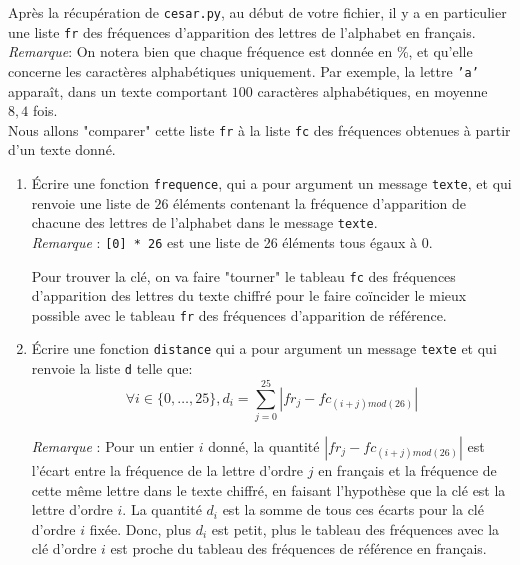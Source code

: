 \documentclass[t,11pt,eleve]{article}
\begin{document}
Après la récupération de \texttt{cesar.py}, au début de votre fichier, il y a en particulier une liste \texttt{fr} des fréquences d'apparition %
des lettres de l'alphabet en français.\\
\emph{Remarque}: On notera bien que chaque fréquence est donnée en \%, et  qu'elle concerne les caractères alphabétiques uniquement. Par exemple, la lettre \texttt{'a'} apparaît, dans un texte comportant  $100$ caractères alphabétiques, en moyenne $8,4$ fois.\\

Nous allons "comparer" cette liste \texttt{fr} à la liste \texttt{fc} des fréquences obtenues à partir d'un texte donné.

\begin{enumerate}
\item \'Ecrire une fonction \texttt{frequence}, qui a pour argument un message \texttt{texte}, et qui renvoie une liste de $26$ éléments contenant la fréquence d'apparition de chacune des lettres de l'alphabet dans le message \texttt{texte}.\\
\emph{Remarque} : \texttt{[0] * 26} est une liste de 26 éléments tous égaux à $0$.


Pour trouver la clé, on va faire "tourner" le tableau \texttt{fc} des fréquences d'apparition des lettres du texte chiffré pour le faire coïncider le mieux possible avec le tableau \texttt{fr} des fréquences d'apparition de référence.
\bigskip
\item \'Ecrire une fonction \texttt{distance} qui a pour argument un message \texttt{texte} et qui renvoie la liste \texttt{d} telle que:
\[\forall i\in\{0,\dots,25\},d_i=\sum_{j=0}^{25}|fr_j-fc_{(i+j)mod(26)}|\]

\emph{Remarque} : Pour un  entier $i$ donné, la quantité $|fr_j-fc_{(i+j)mod(26)}|$ est l'écart entre la fréquence de la lettre d'ordre $j$ en français et la fréquence de cette même lettre dans le texte chiffré, en faisant l'hypothèse que la clé est la lettre d'ordre $i$. 
La quantité $d_i$ est la somme de tous ces écarts pour la clé d'ordre $i$ fixée. Donc, plus $d_i$ est petit, plus le tableau des fréquences avec la clé d'ordre $i$ est proche du tableau des fréquences de référence en français.




\end{enumerate}
\end{document}
